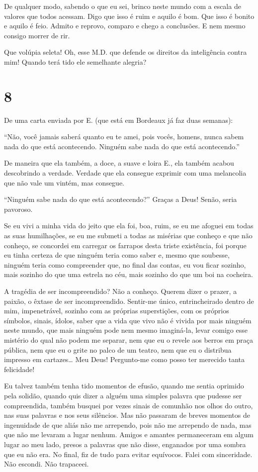 De qualquer modo, sabendo o que eu sei, brinco neste mundo com a escala
de valores que todos acessam. Digo que isso é ruim e aquilo é bom. Que
isso é bonito e aquilo é feio. Admito e reprovo, comparo e chego a
conclusões. E nem mesmo consigo morrer de rir.

Que volúpia seleta! Oh, esse M.D. que defende os direitos da
inteligência contra mim! Quando terá tido ele semelhante alegria?

\section{8}

De uma carta enviada por E. (que está em Bordeaux já faz duas semanas):

``Não, você jamais saberá quanto eu te amei, pois vocês, homens, nunca
sabem nada do que está acontecendo. Ninguém sabe nada do que está
acontecendo.''

De maneira que ela também, a doce, a suave e loira E., ela também acabou
descobrindo a verdade. Verdade que ela consegue exprimir com uma
melancolia que não vale um vintém, mas consegue.

``Ninguém sabe nada do que está acontecendo?'' Graças a Deus! Senão,
seria pavoroso.

Se eu vivi a minha vida do jeito que ela foi, boa, ruim, se eu me
afoguei em todas as suas humilhações, se eu me submeti a todas as
misérias que conheço e que não conheço, se concordei em carregar os
farrapos desta triste existência, foi porque eu tinha certeza de que
ninguém teria como saber e, mesmo que soubesse, ninguém teria como
compreender que, no final das contas, eu vou ficar sozinho, mais sozinho
do que uma estrela no céu, mais sozinho do que um boi na cocheira.

A tragédia de ser incompreendido? Não a conheço. Querem dizer o prazer,
a paixão, o êxtase de ser incompreendido. Sentir-me único,
entrincheirado dentro de mim, impenetrável, sozinho com as próprias
superstições, com os próprios símbolos, sinais, ídolos, saber que a vida
que vivo não é vivida por mais ninguém neste mundo, que mais ninguém
pode nem mesmo imaginá-la, levar comigo esse mistério do qual não podem
me separar, nem que eu o revele aos berros em praça pública, nem que eu
o grite no palco de um teatro, nem que eu o distribua impresso em
cartazes\ldots{} Meu Deus! Pergunto-me como posso ter merecido tanta
felicidade!

Eu talvez também tenha tido momentos de efusão, quando me sentia
oprimido pela solidão, quando quis dizer a alguém uma simples palavra
que pudesse ser compreendida, também busquei por vezes sinais de
comunhão nos olhos do outro, nas suas palavras e nos seus silêncios. Mas
não passaram de breves momentos de ingenuidade de que aliás não me
arrependo, pois não me arrependo de nada, mas que não me levaram a lugar
nenhum. Amigos e amantes permaneceram em algum lugar ao meu lado, presos
a palavras que não disse, enganados por uma sombra que eu não era. No
final, fiz de tudo para evitar equívocos. Falei com sinceridade. Não
escondi. Não trapaceei.

